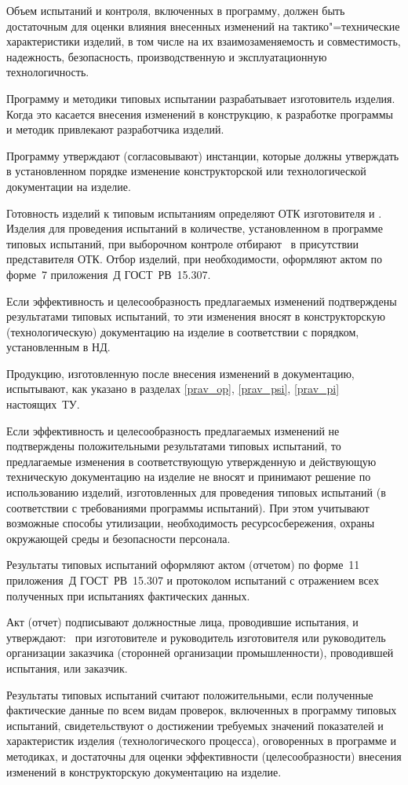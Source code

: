 Объем испытаний и контроля, включенных в программу, должен быть достаточным для оценки влияния внесенных изменений на тактико"=технические характеристики изделий, в том числе на их взаимозаменяемость и совместимость, надежность, безопасность, производственную и эксплуатационную технологичность.

\point 
Программу и методики типовых испытании разрабатывает изготовитель изделия. Когда это касается внесения изменений в конструкцию, к разработке программы и методик привлекают разработчика изделий.

Программу утверждают (согласовывают) инстанции, которые должны утверждать в установленном порядке изменение конструкторской или технологической документации на изделие.

\point 
Готовность изделий к типовым испытаниям определяют ОТК изготовителя и \client. Изделия для проведения испытаний в количестве, установленном в программе типовых испытаний, при выборочном контроле отбирают \client \ в присутствии представителя ОТК. Отбор изделий, при необходимости, оформляют актом по форме~7 приложения~Д ГОСТ~РВ~15.307.

\point 
Если эффективность и целесообразность предлагаемых изменений подтверждены результатами типовых испытаний, то эти изменения вносят в конструкторскую (технологическую) документацию на изделие в соответствии с порядком, установленным в НД.

Продукцию, изготовленную после внесения изменений в документацию, испытывают, как указано в разделах \ref{prav_op}, \ref{prav_psi}, \ref{prav_pi} настоящих~ТУ.

\point 
Если эффективность и целесообразность предлагаемых изменений не подтверждены положительными результатами типовых испытаний, то предлагаемые изменения в соответствующую утвержденную и действующую техническую документацию на изделие не вносят и принимают решение по использованию изделий, изготовленных для проведения типовых испытаний (в соответствии с требованиями программы испытаний). При этом учитывают возможные способы утилизации, необходимость ресурсосбережения, охраны окружающей среды и  безопасности персонала.

\point 
Результаты типовых испытаний оформляют актом (отчетом) по форме~11 приложения~Д 
ГОСТ~РВ~15.307 и протоколом испытаний с отражением всех полученных при испытаниях фактических данных.

Акт (отчет) подписывают должностные лица, проводившие испытания, и утверждают: \client \ при изготовителе и руководитель изготовителя или руководитель организации заказчика (сторонней организации промышленности), проводившей испытания, или заказчик.

\point
Результаты типовых испытаний считают положительными, если полученные фактические данные по всем видам проверок, включенных в программу типовых испытаний, свидетельствуют о достижении требуемых значений показателей и характеристик изделия (технологического процесса), оговоренных в программе и методиках, и достаточны для оценки эффективности (целесообразности) внесения изменений в конструкторскую документацию на изделие.